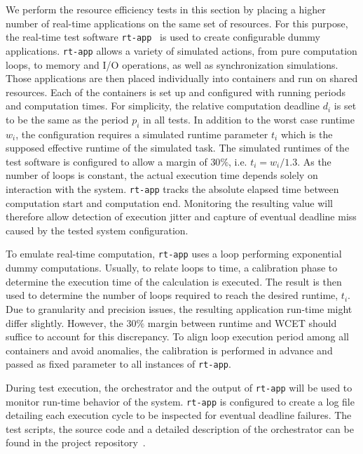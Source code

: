 \documentclass[]{scrartcl}
\begin{document}
We perform the resource efficiency tests in this section by placing a higher number of real-time applications on the same set of resources.
For this purpose, the real-time test software \texttt{rt-app}~\cite{rtapp01} is used to create configurable dummy applications. 
\texttt{rt-app} allows a variety of simulated actions, from pure computation loops, to memory and I/O operations, as well as synchronization simulations.
Those applications are then placed individually into containers and run on shared resources. 
Each of the containers is set up and configured with running periods and computation times.
For simplicity, the relative computation deadline $d_i$ is set to be the same as the period $p_i$ in all tests.
In addition to the worst case runtime $w_i$, the configuration requires a simulated runtime parameter $t_i$ which is the supposed effective runtime of the simulated task.
The simulated runtimes of the test software is configured to allow a margin of $30\%$, i.e. $t_i = w_i / 1.3$.
As the number of loops is constant, the actual execution time depends solely on interaction with the system.
\texttt{rt-app} tracks the absolute elapsed time between computation start and computation end.
Monitoring the resulting value will therefore allow detection of execution jitter and capture of eventual deadline miss caused by the tested system configuration.

To emulate real-time computation, \texttt{rt-app} uses a loop performing exponential dummy computations. 
Usually, to relate loops to time, a calibration phase to determine the execution time of the calculation is executed.
The result is then used to determine the number of loops required to reach the desired runtime, $t_i$. 
Due to granularity and precision issues, the resulting application run-time might differ slightly.
However, the $30\%$ margin between runtime and WCET should suffice to account for this discrepancy.
To align loop execution period among all containers and avoid anomalies, the calibration is performed in advance and passed as fixed parameter to all instances of \texttt{rt-app}.


During test execution, the orchestrator and the output of \texttt{rt-app} will be used to monitor run-time behavior of the system.
\texttt{rt-app} is configured to create a log file detailing each execution cycle to be inspected for eventual deadline failures.
The test scripts, the source code and a detailed description of the orchestrator can be found in the project repository~\cite{homep01}.
\end{document}
